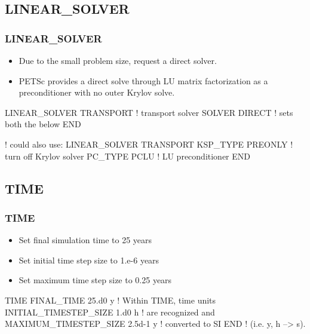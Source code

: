\documentclass{beamer}
\newcommand\redcomment[1]{{{\color{red} #1}}}
\newcommand\bluecomment[1]{{{\color{blue} #1}}}
\newcommand\greencomment[1]{{{\color{green} #1}}}
\begin{document}
\subsection{LINEAR\_SOLVER}

\begin{frame}[fragile]\frametitle{LINEAR\_SOLVER}

\begin{itemize}
\item Due to the small problem size, request a direct solver.
\item PETSc provides a direct solve through LU matrix factorization as a preconditioner with no outer Krylov solve.
\end{itemize}

\begin{semiverbatim}

LINEAR_SOLVER TRANSPORT   \bluecomment{! transport solver}
  SOLVER DIRECT           \bluecomment{! sets both the below}
END

\bluecomment{! could also use:}
LINEAR_SOLVER TRANSPORT
  KSP_TYPE PREONLY        \bluecomment{! turn off Krylov solver}
  PC_TYPE PCLU            \bluecomment{! LU preconditioner}
END

\end{semiverbatim}

\end{frame}

\subsection{TIME}

\begin{frame}[fragile]\frametitle{TIME}

\begin{itemize}
\item Set final simulation time to 25 years
\item Set initial time step size to 1.e-6 years
\item Set maximum time step size to 0.25 years
\end{itemize}


\begin{semiverbatim}

TIME
  FINAL_TIME 25.d0 \redcomment{y}            \bluecomment{! Within TIME, time units}
  INITIAL_TIMESTEP_SIZE 1.d0 \redcomment{h}    \bluecomment{! are recognized and}
  MAXIMUM_TIMESTEP_SIZE 2.5d-1 \redcomment{y}  \bluecomment{! converted to SI}
END                               \bluecomment{! (i.e. \redcomment{y}, \redcomment{h} --> \greencomment{s}).}
\end{semiverbatim}

\end{frame}
\end{document}
